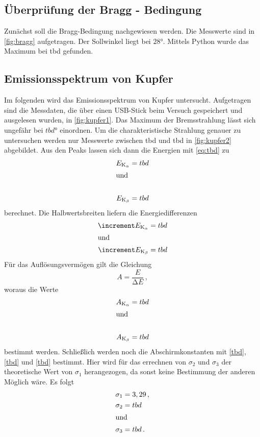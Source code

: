 \subsection{Überprüfung der Bragg - Bedingung}
Zunächst soll die Bragg-Bedingung nachgewiesen werden.
Die Messwerte sind in \autoref{fig:bragg} aufgetragen.
Der Sollwinkel liegt bei $28°$.
Mittels Python wurde das Maximum bei tbd gefunden. %


\subsection{Emissionsspektrum von Kupfer}
Im folgenden wird das Emissionsspektrum von Kupfer untersucht.
Aufgetragen sind die Messdaten, die über einen USB-Stick beim Versuch gespeichert und ausgelesen wurden, in \autoref{fig:kupfer1}.
Das Maximum der Bremsstrahlung lässt sich ungefähr bei $tbd °$ einordnen.
Um die charakteristische Strahlung genauer zu untersuchen werden nur Messwerte zwischen tbd und tbd in \autoref{fig:kupfer2} abgebildet.
Aus den Peaks lassen sich dann die Energien mit \autoref{eq:tbd} zu
\begin{align*}
  E_{\text{K}_\alpha} = tbd \\ %
  \intertext{und} \\
  E_{\text{K}_\beta} = tbd %
\end{align*}
berechnet.
Die Halbwertsbreiten liefern die Energiedifferenzen
\begin{align*}
  \increment E_{\text{K}_\alpha} &= tbd \\ %
  \intertext{und}
  \increment E_{\text{K}_\beta} &= tbd %
\end{align*}
Für das Auflösungsvermögen gilt die Gleichung
\begin{equation*}
  A = \frac{E}{\increment E} \, ,
\end{equation*}
woraus die Werte
\begin{align*}
  A_{\text{K}_\alpha} = tbd\\
  \intertext{und} \\
  A_{\text{K}_\beta} = tbd
\end{align*}
bestimmt werden.
Schließlich werden noch die Abschirmkonstanten mit \autoref{tbd}, \autoref{tbd} und \autoref{tbd} bestimmt.
Hier wird für das errechnen von $\sigma_2$ und $\sigma_3$ der theoretische Wert von $\sigma_1$ herangezogen, da sonst keine Bestimmung der anderen Möglich wäre. 
Es folgt
\begin{align*}
  \sigma_{1} &= 3,29 \, ,\\
  \sigma_{2} &= tbd \\ 
  \intertext{und}
  \sigma_{3} &= tbd \, .
\end{align*}

